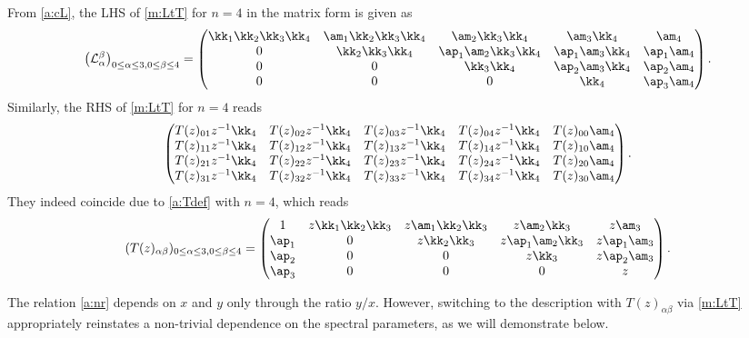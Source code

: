 \begin{exam}\label{a:ex:L}
From \eqref{a:cL}, the LHS of \eqref{m:LtT}  for $n=4$ in the matrix form is given as
\begin{equation}
\bigl(\mathcal{L}_\alpha^\beta\bigr)_{0 \le \alpha \le 3, 0 \le \beta \le 4}
=\begin{pmatrix}
 \kk_1 \kk_2 \kk_3 \kk_4 &  \am_1\kk_2\kk_3\kk_4 &  \am_2\kk_3\kk_4 &  \am_3\kk_4 &  \am_4
\\
0 &  \kk_2 \kk_3\kk_4 & \ap_1\am_2 \kk_3\kk_4 &  \ap_1 \am_3 \kk_4 & \ap_1 \am_4
\\
0 & 0 &  \kk_3 \kk_4 &  \ap_2\am_3 \kk_4 &  \ap_2\am_4 
\\
0 & 0 & 0 &  \kk_4 &  \ap_3\am_4
\end{pmatrix}.
\end{equation}
Similarly, the RHS of \eqref{m:LtT} for $n=4$ reads
\begin{align}
\begin{pmatrix}
T(z)_{01}z^{-1}\kk_4 & T(z)_{02}z^{-1}\kk_4 & T(z)_{03}z^{-1}\kk_4 & T(z)_{04}z^{-1}\kk_4 & T(z)_{00}\am_4
\\
T(z)_{11}z^{-1}\kk_4 & T(z)_{12}z^{-1}\kk_4 & T(z)_{13}z^{-1}\kk_4 & T(z)_{14}z^{-1}\kk_4 & T(z)_{10}\am_4
\\
T(z)_{21}z^{-1}\kk_4 & T(z)_{22}z^{-1}\kk_4 & T(z)_{23}z^{-1}\kk_4 & T(z)_{24}z^{-1}\kk_4 & T(z)_{20}\am_4
\\
T(z)_{31}z^{-1}\kk_4 & T(z)_{32}z^{-1}\kk_4 & T(z)_{33}z^{-1}\kk_4 & T(z)_{34}z^{-1}\kk_4 & T(z)_{30}\am_4
\end{pmatrix}.
\end{align}
They indeed coincide due to \eqref{a:Tdef} with $n=4$, which reads
\begin{align}\label{a:ex:t4}
(T(z)_{\alpha \beta})_{0 \le \alpha \le 3, 0 \le \beta \le 4}
=\begin{pmatrix}
1 & z \kk_1\kk_2 \kk_3 & z \am_1\kk_2 \kk_3 & z \am_2 \kk_3  & z\am_3
\\
\ap_1 & 0 & z \kk_2\kk_3 & z \ap_1 \am_2 \kk_3 & z \ap_1\am_3
\\
\ap_2 & 0 & 0 & z \kk_3 & z \ap_2\am_3
\\
\ap_3 & 0 & 0 & 0 & z
\end{pmatrix}.
\end{align} 
\end{exam}

The relation \eqref{a:nr} depends on \( x \) and \( y \) 
only through the ratio \( y/x \). 
However, switching to the description with \( T(z)_{\alpha \beta} \) 
via \eqref{m:LtT} appropriately reinstates a non-trivial dependence 
on the spectral parameters, as we will demonstrate below.

